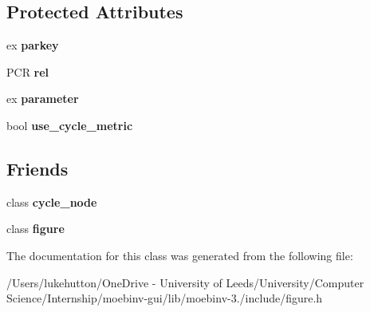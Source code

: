 \subsection*{Protected Attributes}
\begin{DoxyCompactItemize}
\item 
\mbox{\label{class_moeb_inv_1_1cycle__relation_a7f895ff256fae59239bf1cb075f5b28c}} 
ex {\bfseries parkey}
\item 
\mbox{\label{class_moeb_inv_1_1cycle__relation_a720f4183a6c4d0d467b1c1b4d47b60ae}} 
P\+CR {\bfseries rel}
\item 
\mbox{\label{class_moeb_inv_1_1cycle__relation_abedf888e85ce0f3eb5f62dfa72c5eb88}} 
ex {\bfseries parameter}
\item 
\mbox{\label{class_moeb_inv_1_1cycle__relation_a9afaded728597f76bbbe36cd5ed6de5f}} 
bool {\bfseries use\+\_\+cycle\+\_\+metric}
\end{DoxyCompactItemize}
\subsection*{Friends}
\begin{DoxyCompactItemize}
\item 
\mbox{\label{class_moeb_inv_1_1cycle__relation_ab1135e74268f9c17da7328c07edd8b09}} 
class {\bfseries cycle\+\_\+node}
\item 
\mbox{\label{class_moeb_inv_1_1cycle__relation_ac46ec1ee00928c9cde5b63a7edba7b7a}} 
class {\bfseries figure}
\end{DoxyCompactItemize}


The documentation for this class was generated from the following file\+:\begin{DoxyCompactItemize}
\item 
/\+Users/lukehutton/\+One\+Drive -\/ University of Leeds/\+University/\+Computer Science/\+Internship/moebinv-\/gui/lib/moebinv-\/3./include/figure.\+h\end{DoxyCompactItemize}
